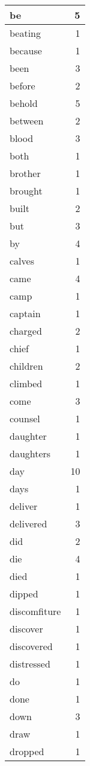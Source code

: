 \begin{center}
\begin{longtable}{l|r}
be & 5 \\ \hline
beating & 1 \\ \hline
because & 1 \\ \hline
been & 3 \\ \hline
before & 2 \\ \hline
behold & 5 \\ \hline
between & 2 \\ \hline
blood & 3 \\ \hline
both & 1 \\ \hline
brother & 1 \\ \hline
brought & 1 \\ \hline
built & 2 \\ \hline
but & 3 \\ \hline
by & 4 \\ \hline
calves & 1 \\ \hline
came & 4 \\ \hline
camp & 1 \\ \hline
captain & 1 \\ \hline
charged & 2 \\ \hline
chief & 1 \\ \hline
children & 2 \\ \hline
climbed & 1 \\ \hline
come & 3 \\ \hline
counsel & 1 \\ \hline
daughter & 1 \\ \hline
daughters & 1 \\ \hline
day & 10 \\ \hline
days & 1 \\ \hline
deliver & 1 \\ \hline
delivered & 3 \\ \hline
did & 2 \\ \hline
die & 4 \\ \hline
died & 1 \\ \hline
dipped & 1 \\ \hline
discomfiture & 1 \\ \hline
discover & 1 \\ \hline
discovered & 1 \\ \hline
distressed & 1 \\ \hline
do & 1 \\ \hline
done & 1 \\ \hline
down & 3 \\ \hline
draw & 1 \\ \hline
dropped & 1 \\ \hline

\end{longtable}
\end{center}
